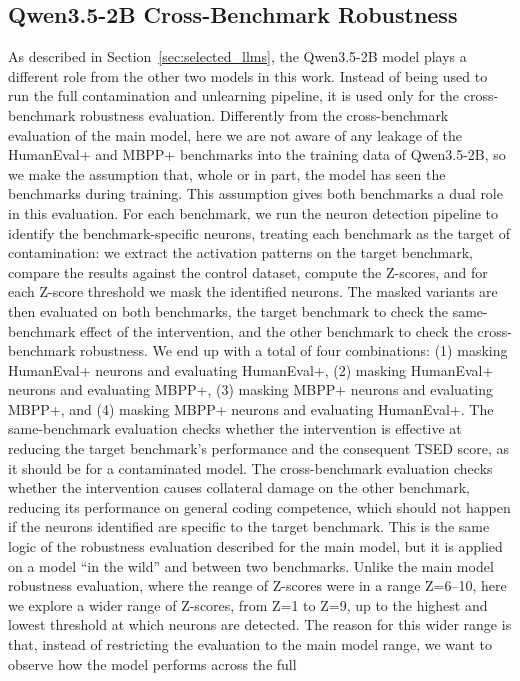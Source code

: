 \documentclass[mscthesis]{usiinfthesis}
\begin{document}
\subsection{Qwen3.5-2B Cross-Benchmark Robustness}
As described in Section~\ref{sec:selected_llms}, the Qwen3.5-2B model plays a different role
from the other two models in this work.
Instead of being used to run the full contamination and unlearning pipeline, it is used only
for the cross-benchmark robustness evaluation.
Differently from the cross-benchmark evaluation of the main model, here we are not aware of any leakage of the HumanEval+ and MBPP+ benchmarks into the training data of Qwen3.5-2B,
so we make the assumption that, whole or in part, the model has seen the benchmarks during training.
This assumption gives both benchmarks a dual role in this evaluation.
For each benchmark, we run the neuron detection pipeline to identify the benchmark-specific neurons,
treating each benchmark as the target of contamination: we extract the activation patterns
on the target benchmark, compare the results against the control dataset, compute the Z-scores, 
and for each Z-score threshold we mask the identified neurons.
The masked variants are then evaluated on both benchmarks, the target benchmark
to check the same-benchmark effect of the intervention, and the other benchmark
to check the cross-benchmark robustness.
We end up with a total of four combinations: (1) masking HumanEval+ neurons and evaluating
HumanEval+, (2) masking HumanEval+ neurons and evaluating MBPP+, (3) masking MBPP+ 
neurons and evaluating MBPP+, and (4) masking MBPP+ neurons and evaluating HumanEval+.
The same-benchmark evaluation checks whether the intervention is effective at 
reducing the target benchmark's performance and the consequent TSED score, as it should be
for a contaminated model.
The cross-benchmark evaluation checks whether the intervention causes collateral damage on
the other benchmark, reducing its performance on general coding competence, which should not happen if the neurons identified are specific to the target benchmark.
This is the same logic of the robustness evaluation described for the main model, but it is applied on a model ``in the wild'' and between two benchmarks.
Unlike the main model robustness evaluation, where the reange of Z-scores were in a range Z=6--10, here we explore a wider range of Z-scores, 
from Z=1 to Z=9, up to the highest and lowest threshold at which neurons are detected.
The reason for this wider range is that, instead of restricting the evaluation
to the main model range, we want to observe how the model performs across the full
\end{document}
